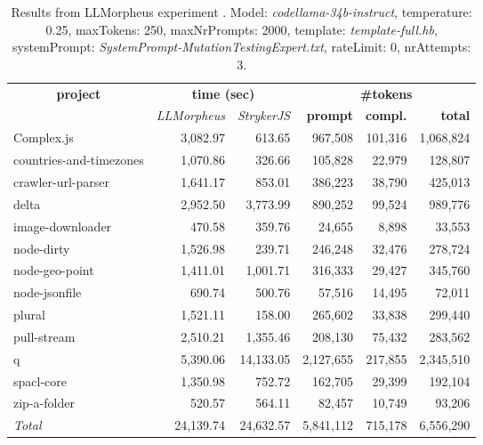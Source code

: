 
\begin{table*}[hbt!]
\centering
{\scriptsize
\begin{tabular}{l||r|r|r|r|r}
\multicolumn{1}{c|}{\bf project} & \multicolumn{2}{|c|}{\bf time (sec)} & \multicolumn{3}{|c|}{\bf \#tokens} \\
               & {\it LLMorpheus} & {\it StrykerJS} & {\bf prompt} & {\bf compl.} & {\bf total} \\
\hline
  Complex.js & 3,082.97 & 613.65 & 967,508 & 101,316 & 1,068,824 \\ 
countries-and-timezones & 1,070.86 & 326.66 & 105,828 & 22,979 & 128,807 \\ 
crawler-url-parser & 1,641.17 & 853.01 & 386,223 & 38,790 & 425,013 \\ 
delta & 2,952.50 & 3,773.99 & 890,252 & 99,524 & 989,776 \\ 
image-downloader & 470.58 & 359.76 & 24,655 & 8,898 & 33,553 \\ 
node-dirty & 1,526.98 & 239.71 & 246,248 & 32,476 & 278,724 \\ 
node-geo-point & 1,411.01 & 1,001.71 & 316,333 & 29,427 & 345,760 \\ 
node-jsonfile & 690.74 & 500.76 & 57,516 & 14,495 & 72,011 \\ 
plural & 1,521.11 & 158.00 & 265,602 & 33,838 & 299,440 \\ 
pull-stream & 2,510.21 & 1,355.46 & 208,130 & 75,432 & 283,562 \\ 
q & 5,390.06 & 14,133.05 & 2,127,655 & 217,855 & 2,345,510 \\ 
spacl-core & 1,350.98 & 752.72 & 162,705 & 29,399 & 192,104 \\ 
zip-a-folder & 520.57 & 564.11 & 82,457 & 10,749 & 93,206 \\ 
\hline
  \textit{Total} & 24,139.74 & 24,632.57 & 5,841,112 & 715,178 & 6,556,290 \\
  \end{tabular}
  }
  \\[2mm]
  \caption{Results from LLMorpheus experiment .
    Model: \textit{codellama-34b-instruct}, 
    temperature: 0.25, 
    maxTokens: 250, 
    maxNrPrompts: 2000, 
    template: \textit{template-full.hb}, 
    systemPrompt: \textit{SystemPrompt-MutationTestingExpert.txt}, 
    rateLimit: 0, 
    nrAttempts: 3.  
  }
  \label{table:Cost:run353:codellama-34b-instruct:template-full.hb:0.25}
\end{table*}